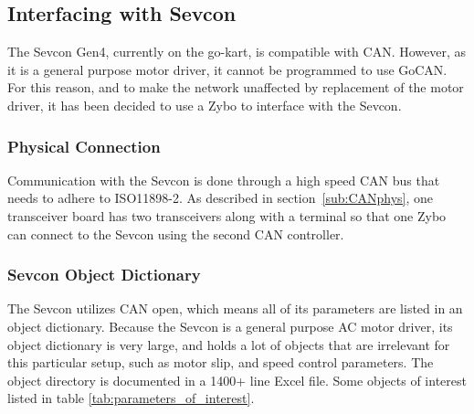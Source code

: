 

\subsection{Interfacing with Sevcon}\label{sub:Sevcon_interfacing}
The Sevcon Gen4, currently on the go-kart, is compatible with CAN.
However, as it is a general purpose motor driver, it cannot be programmed to use GoCAN. 
For this reason, and to make the network unaffected by replacement of the motor driver, it has been decided to use a Zybo to interface with the Sevcon.

\subsubsection*{Physical Connection}\label{sub:sevcon_physical_connection}
Communication with the Sevcon is done through a high speed CAN bus that needs to adhere to ISO11898-2.
As described in section~\ref{sub:CANphys}, one transceiver board has two transceivers along with a terminal so that one Zybo can connect to the Sevcon using the second CAN controller.

\subsubsection*{Sevcon Object Dictionary}\label{sub:sevcon_object_dictionary}
The Sevcon utilizes CAN open, which means all of its parameters are listed in an object dictionary.
Because the Sevcon is a general purpose AC motor driver, its object dictionary is very large, and holds a lot of objects that are irrelevant for this particular setup, such as motor slip, and speed control parameters. 
The object directory is documented in a 1400+ line Excel file. 
Some objects of interest listed in table \ref{tab:parameters_of_interest}.

